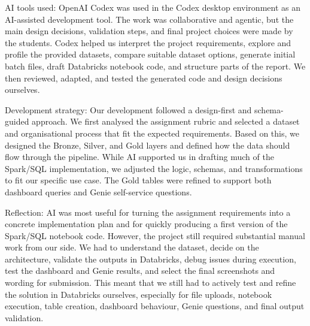 \documentclass[10pt,a4paper]{article}
\begin{document}
AI tools used:
OpenAI Codex was used in the Codex desktop environment as an AI-assisted development tool. The work was collaborative and agentic, but the main design decisions, validation steps, and final project choices were made by the students. Codex helped us interpret the project requirements, explore and profile the provided datasets, compare suitable dataset options, generate initial batch files, draft Databricks notebook code, and structure parts of the report. We then reviewed, adapted, and tested the generated code and design decisions ourselves.

Development strategy:
Our development followed a design-first and schema-guided approach. We first analysed the assignment rubric and selected a dataset and organisational process that fit the expected requirements. Based on this, we designed the Bronze, Silver, and Gold layers and defined how the data should flow through the pipeline. While AI supported us in drafting much of the Spark/SQL implementation, we adjusted the logic, schemas, and transformations to fit our specific use case. The Gold tables were refined to support both dashboard queries and Genie self-service questions.

Reflection:
AI was most useful for turning the assignment requirements into a concrete implementation plan and for quickly producing a first version of the Spark/SQL notebook code. However, the project still required substantial manual work from our side. We had to understand the dataset, decide on the architecture, validate the outputs in Databricks, debug issues during execution, test the dashboard and Genie results, and select the final screenshots and wording for submission. This meant that we still had to actively test and refine the solution in Databricks ourselves, especially for file uploads, notebook execution, table creation, dashboard behaviour, Genie questions, and final output validation.
\end{document}
